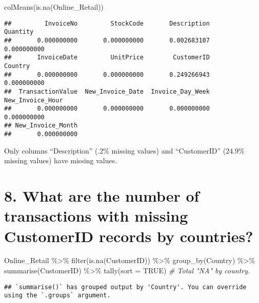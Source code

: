 \documentclass[
]{article}
\newenvironment{Shaded}{\begin{snugshade}}{\end{snugshade}}
\newcommand{\AttributeTok}[1]{\textcolor[rgb]{0.77,0.63,0.00}{#1}}
\newcommand{\CommentTok}[1]{\textcolor[rgb]{0.56,0.35,0.01}{\textit{#1}}}
\newcommand{\ConstantTok}[1]{\textcolor[rgb]{0.00,0.00,0.00}{#1}}
\newcommand{\FunctionTok}[1]{\textcolor[rgb]{0.00,0.00,0.00}{#1}}
\newcommand{\NormalTok}[1]{#1}
\newcommand{\SpecialCharTok}[1]{\textcolor[rgb]{0.00,0.00,0.00}{#1}}
\begin{document}
\begin{Shaded}
\begin{Highlighting}[]
\FunctionTok{colMeans}\NormalTok{(}\FunctionTok{is.na}\NormalTok{(Online\_Retail))}
\end{Highlighting}
\end{Shaded}

\begin{verbatim}
##         InvoiceNo         StockCode       Description          Quantity 
##       0.000000000       0.000000000       0.002683107       0.000000000 
##       InvoiceDate         UnitPrice        CustomerID           Country 
##       0.000000000       0.000000000       0.249266943       0.000000000 
##  TransactionValue  New_Invoice_Date  Invoice_Day_Week  New_Invoice_Hour 
##       0.000000000       0.000000000       0.000000000       0.000000000 
## New_Invoice_Month 
##       0.000000000
\end{verbatim}

Only columns ``Description'' (.2\% missing values) and ``CustomerID''
(24.9\% missing values) have missing values.

\hypertarget{what-are-the-number-of-transactions-with-missing-customerid-records-by-countries}{%
\section{8. What are the number of transactions with missing CustomerID
records by
countries?}\label{what-are-the-number-of-transactions-with-missing-customerid-records-by-countries}}

\begin{Shaded}
\begin{Highlighting}[]
\NormalTok{Online\_Retail }\SpecialCharTok{\%\textgreater{}\%} 
  \FunctionTok{filter}\NormalTok{(}\FunctionTok{is.na}\NormalTok{(CustomerID)) }\SpecialCharTok{\%\textgreater{}\%} 
  \FunctionTok{group\_by}\NormalTok{(Country) }\SpecialCharTok{\%\textgreater{}\%} 
  \FunctionTok{summarise}\NormalTok{(CustomerID) }\SpecialCharTok{\%\textgreater{}\%} 
  \FunctionTok{tally}\NormalTok{(}\AttributeTok{sort =} \ConstantTok{TRUE}\NormalTok{) }\CommentTok{\# Total "NA" by country.}
\end{Highlighting}
\end{Shaded}

\begin{verbatim}
## `summarise()` has grouped output by 'Country'. You can override using the `.groups` argument.
\end{verbatim}
\end{document}
